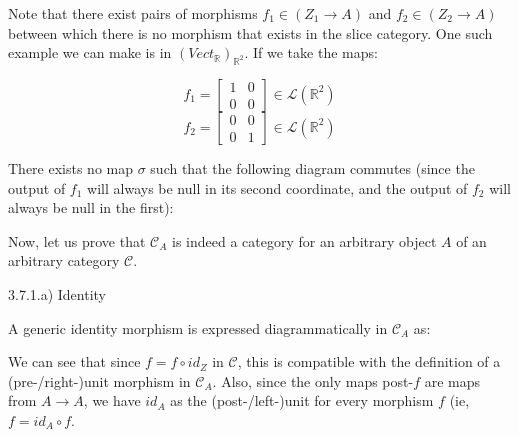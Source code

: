 \documentclass[12pt, letterpaper, twoside]{report}
\begin{document}
Note that there exist pairs of morphisms $f_1 \in (Z_1 \to A)$ and $f_2 \in (Z_2 \to A)$ between which there is no morphism that exists in the slice category. One such example we can make is in $(Vect_\mathbb{R})_{\mathbb{R}^2}$. If we take the maps:

$$f_1 = \begin{bmatrix} 1 & 0 \\ 0 & 0 \end{bmatrix} \in \mathcal{L}(\mathbb{R}^2)$$
$$f_2 = \begin{bmatrix} 0 & 0 \\ 0 & 1 \end{bmatrix} \in \mathcal{L}(\mathbb{R}^2)$$

There exists no map $\sigma$ such that the following diagram commutes (since the output of $f_1$ will always be null in its second coordinate, and the output of $f_2$ will always be null in the first):


Now, let us prove that $\mathcal{C}_A$ is indeed a category for an arbitrary object $A$ of an arbitrary category $\mathcal{C}$.

3.7.1.a) Identity

A generic identity morphism is expressed diagrammatically in $\mathcal{C}_A$ as:


We can see that since $f = f \circ id_Z$ in $\mathcal{C}$, this is compatible with the definition of a (pre-/right-)unit morphism in $\mathcal{C}_A$. Also, since the only maps post-$f$ are maps from $A \to A$, we have $id_A$ as the (post-/left-)unit for every morphism $f$ (ie, $f = id_A \circ f$. 
\end{document}
